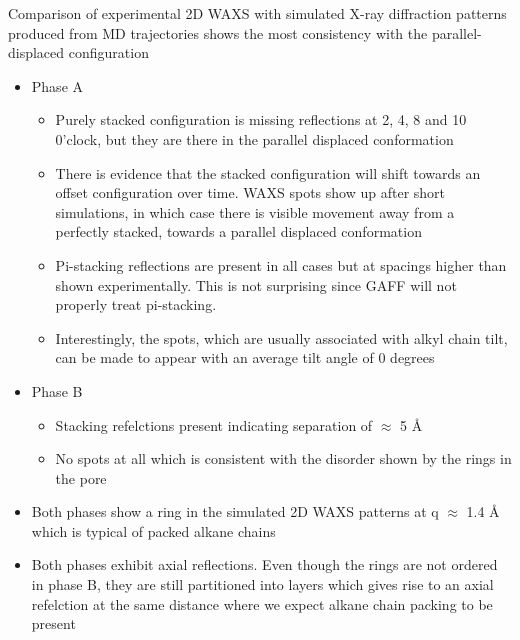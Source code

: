 \documentclass{article}
\newcommand{\angstrom}{\textup{\AA}}
\begin{document}
	Comparison of experimental 2D WAXS with simulated X-ray diffraction patterns produced from MD trajectories shows the most consistency with the parallel-displaced configuration
	\begin{itemize}
		\item Phase A
		\begin{itemize}	
			\item Purely stacked configuration is missing reflections at 2, 4, 8 and 10 0'clock, but they are there in the parallel displaced conformation
			\item There is evidence that the stacked configuration will shift towards an offset configuration over time. WAXS spots show up after short simulations, in which case there is visible movement away from a perfectly stacked, towards a parallel displaced conformation 
			\item Pi-stacking reflections are present in all cases but at spacings higher than shown experimentally. This is not surprising since GAFF will not properly treat pi-stacking.
			\item Interestingly, the spots, which are usually associated with alkyl chain tilt, can be made to appear with an average tilt angle of 0 degrees
		\end{itemize}
		\item Phase B
		\begin{itemize}
			\item Stacking refelctions present indicating separation of $\approx$ 5 \angstrom
			\item No spots at all which is consistent with the disorder shown by the rings in the pore
		\end{itemize}
		\item Both phases show a ring in the simulated 2D WAXS patterns at q $\approx$ 1.4 \angstrom{} which is typical of packed alkane chains
		\item Both phases exhibit axial reflections. Even though the rings are not ordered in phase B, they are still partitioned into layers which gives rise to an axial refelction at the same distance where we expect alkane chain packing to be present   
	\end{itemize} 
\end{document}

